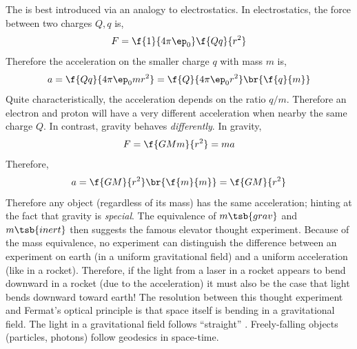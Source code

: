 \documentclass{article}
\begin{document}
The  is best introduced via an analogy to electrostatics. In electrostatics, the force between two charges $Q, q$ is,
\[ F = \f{1}{4\pi\ep_0}\f{Qq}{r^2} \]
Therefore the acceleration on the smaller charge $q$ with mass $m$ is,
\[ a = \f{Qq}{4\pi\ep_0mr^2} = \f{Q}{4\pi\ep_0r^2}\br{\f{q}{m}} \]
Quite characteristically, the acceleration depends on the ratio $q/m$. Therefore an electron and proton will have a very different acceleration when nearby the same charge $Q$. In contrast, gravity behaves \textit{differently}. In gravity,
\[ F = \f{GMm}{r^2} = ma \]
Therefore,
\[ a = \f{GM}{r^2} \br{\f{m}{m}} = \f{GM}{r^2} \]
Therefore any object (regardless of its mass) has the same acceleration; hinting at the fact that gravity is \textit{special}. The equivalence of $m\tsb{grav}$ and $m\tsb{inert}$ then suggests the famous elevator thought experiment. Because of the mass equivalence, no experiment can distinguish the difference between an experiment on earth (in a uniform gravitational field) and a uniform acceleration (like in a rocket). Therefore, if the light from a laser in a rocket appears to bend downward in a rocket (due to the acceleration) it must also be the case that light bends downward toward earth! The resolution between this thought experiment and Fermat's optical principle is that space itself is bending in a gravitational field. The light in a gravitational field follows ``straight'' . Freely-falling objects (particles, photons) follow geodesics in space-time. \\
\end{document}

